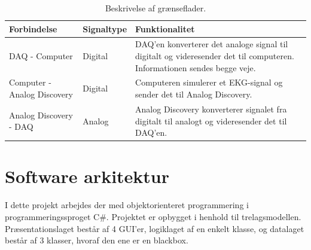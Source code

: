\begin{table}[H] 
	\begin{tabularx}{\textwidth}{l l X}
    \toprule
     \textbf{Forbindelse}   & \textbf{Signaltype} & \textbf{Funktionalitet}    \\ \midrule
     DAQ - Computer         & Digital & DAQ'en konverterer det analoge signal til digitalt og videresender det til 							  computeren. Informationen sendes begge veje. \\ 
     					      \addlinespace[2mm]                                                                                                                                                                            
     Computer - Analog Discovery			& Digital & Computeren simulerer et EKG-signal og sender det til Analog Discovery.\\ 
     				    	  \addlinespace[2mm]   				                                                                                                                                                                           
     Analog Discovery - DAQ			   	& Analog & Analog Discovery	 konverterer signalet fra digitalt til analogt og videresender det til 							      DAQ'en.\\  				      
    \bottomrule                                                                                                                   
    \end{tabularx}
    \caption {Beskrivelse af grænseflader.}
    \label{tab:graenseflader}
\end{table}



\section{Software arkitektur}
I dette projekt arbejdes der med objektorienteret programmering i programmeringssproget C\#. Projektet er opbygget i henhold til trelagsmodellen. Præsentationslaget består af 4 GUI’er, logiklaget af en enkelt klasse, og datalaget består af 3 klasser, hvoraf den ene er en blackbox. 

